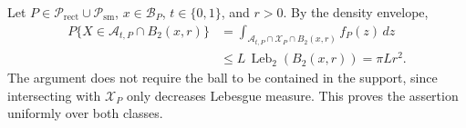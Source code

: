 Let \(P\in\mathcal P_{\mathrm{rect}}\cup\mathcal P_{\mathrm{sm}}\), \(x\in\mathcal B_P\), \(t\in\{0,1\}\), and \(r>0\).  By the density envelope,
\[
\begin{aligned}
P\{X\in\mathcal A_{t,P}\cap B_2(x,r)\}
&=\int_{\mathcal A_{t,P}\cap\mathcal X_P\cap B_2(x,r)}f_P(z)\,dz\\
&\leq L\,\operatorname{Leb}_2(B_2(x,r))
=\pi Lr^2.
\end{aligned}
\]
The argument does not require the ball to be contained in the support, since intersecting with \(\mathcal X_P\) only decreases Lebesgue measure.  This proves the assertion uniformly over both classes.